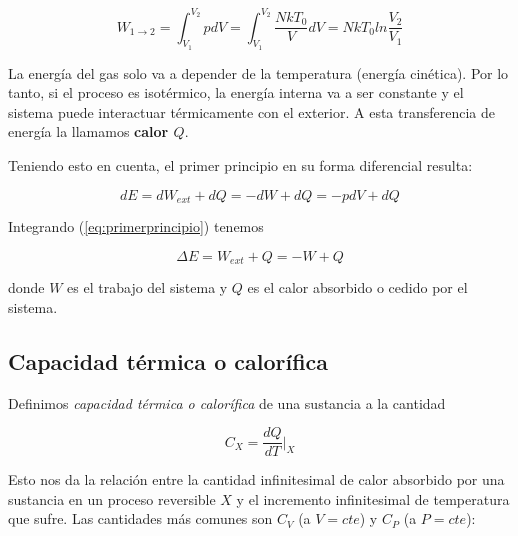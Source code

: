 \documentclass[a4paper]{article}
\begin{document}
$$ W_{1 \rightarrow 2} = \int_{V_{1}}^{V_{2}} pdV = \int_{V_{1}}^{V_{2}} \frac{NkT_{0}}{V} dV = NkT_{0} ln \frac{V_{2}}{V_{1}}$$

La energ\'ia del gas solo va a depender de la temperatura (energ\'ia cin\'etica). Por lo tanto, si el proceso es isot\'ermico, la energ\'ia interna va a ser constante y el sistema puede interactuar t\'ermicamente con el exterior. A esta transferencia de energ\'ia la llamamos \textbf{calor $Q$}.\newline

Teniendo esto en cuenta, el primer principio en su forma diferencial resulta:

\begin{equation}
\label{eq:primerprincipio}
dE = dW_{ext} + dQ = -dW + dQ = -pdV + dQ
\end{equation}

Integrando (\ref{eq:primerprincipio}) tenemos

\begin{equation}
\label{eq:primerprincipio2}
\Delta E = W_{ext} + Q = -W + Q
\end{equation}

donde $W$ es el trabajo del sistema y $Q$ es el calor absorbido o cedido por el sistema.

\subsection{Capacidad t\'ermica o calor\'ifica}

Definimos \textit{capacidad t\'ermica o calor\'ifica} de una sustancia a la cantidad

$$C_{X} = \frac{dQ}{dT}\bigg|_{X}$$

Esto nos da la relaci\'on entre la cantidad infinitesimal de calor absorbido por una sustancia en un proceso reversible $X$ y el incremento infinitesimal de temperatura que sufre. Las cantidades m\'as comunes son $C_{V}$ (a $V = cte$) y $C_{P}$ (a $P = cte$):\\
\end{document}
